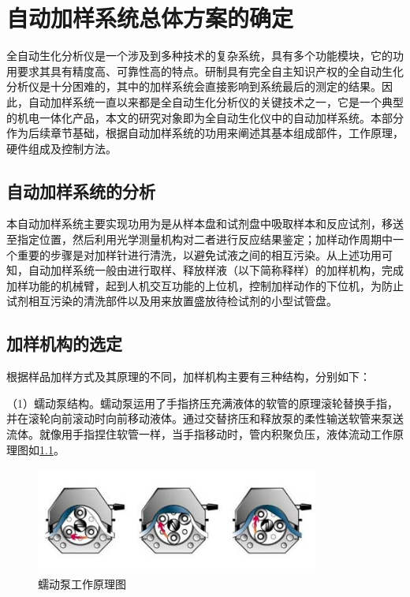 \chapter{自动加样系统总体方案的确定}
全自动生化分析仪是一个涉及到多种技术的复杂系统，具有多个功能模块，它的功用要求其具有精度高、可靠性高的特点。研制具有完全自主知识产权的全自动生化分析仪是十分困难的，其中的加样系统会直接影响到系统最后的测定的结果。因此，自动加样系统一直以来都是全自动生化分析仪的关键技术之一，它是一个典型的机电一体化产品，本文的研究对象即为全自动生化仪中的自动加样系统。本部分作为后续章节基础，根据自动加样系统的功用来阐述其基本组成部件，工作原理，硬件组成及控制方法。

\section{自动加样系统的分析}

本自动加样系统主要实现功用为是从样本盘和试剂盘中吸取样本和反应试剂，移送至指定位置，然后利用光学测量机构对二者进行反应结果鉴定；加样动作周期中一个重要的步骤是对加样针进行清洗，以避免试液之间的相互污染。从上述功用可知，自动加样系统一般由进行取样、释放样液（以下简称释样）的加样机构，完成加样功能的机械臂，起到人机交互功能的上位机，控制加样动作的下位机，为防止试剂相互污染的清洗部件以及用来放置盛放待检试剂的小型试管盘。

\section{加样机构的选定}
根据样品加样方式及其原理的不同，加样机构主要有三种结构\supercite{bib3}，分别如下：

（1）蠕动泵结构。蠕动泵运用了手指挤压充满液体的软管的原理滚轮替换手指，并在滚轮向前滚动时向前移动液体。通过交替挤压和释放泵的柔性输送软管来泵送流体。就像用手指捏住软管一样，当手指移动时，管内积聚负压，液体流动工作原理图如\ref{fig:2-1}。

\begin{figure}[htbp!]
  \centering
  \includegraphics[height=3.5cm]{chap/figure/2-1.jpg}
  \caption{蠕动泵工作原理图}
  \label{fig:2-1}
\end{figure}

